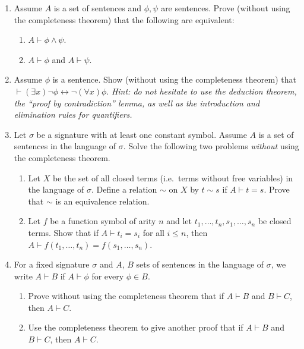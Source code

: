 \documentclass{amsart}
\theoremstyle{definition}
\newcommand{\proves}{\vdash}
\begin{document}
\begin{enumerate}

\item Assume $A$ is a set of sentences and $\phi, \psi$ are sentences. Prove (without using the completeness theorem) that the following are equivalent:
  \begin{enumerate}
  \item $A \proves \phi \land \psi$.
  \item $A \proves \phi$ and $A \proves \psi$.
  \end{enumerate}

\item Assume $\phi$ is a sentence. Show (without using the completeness theorem) that $\proves (\exists x) \neg \phi \leftrightarrow \neg (\forall x) \phi$. \emph{Hint: do not hesitate to use the deduction theorem, the ``proof by contradiction'' lemma, as well as the introduction and elimination rules for quantifiers.}  
\item Let $\sigma$ be a signature with at least one constant symbol. Assume $A$ is a set of sentences in the language of $\sigma$. Solve the following two problems \emph{without} using the completeness theorem.

  \begin{enumerate}

  \item Let $X$ be the set of all closed terms (i.e.\ terms without free variables) in the language of $\sigma$. Define a relation $\sim$ on $X$ by $t \sim s$ if $A \proves t = s$. Prove that $\sim$ is an equivalence relation.
  \item Let $f$ be a function symbol of arity $n$ and let $t_1, \ldots, t_n, s_1, \ldots, s_n$ be closed terms. Show that if $A \proves t_i = s_i$ for all $i \le n$, then $A \proves f (t_1, \ldots, t_n) = f (s_1, \ldots, s_n)$.
  \end{enumerate}
\item For a fixed signature $\sigma$ and $A$, $B$ sets of sentences in the language of $\sigma$, we write $A \proves B$  if $A \proves \phi$ for every $\phi \in B$.

  \begin{enumerate}
  \item Prove without using the completeness theorem that if $A \proves B$ and $B \proves C$, then $A \proves C$. 
  \item Use the completeness theorem to give another proof that if $A \proves B$ and $B \proves C$, then $A \proves C$.
  \end{enumerate}
  
\end{enumerate}



\end{document}
